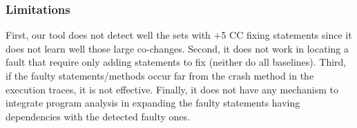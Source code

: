 

\subsubsection{\bf Limitations}
First, our tool does not detect well the sets with +5 CC fixing statements
since it does not learn well those large co-changes. Second, it
does not work in locating a fault that require only adding
statements to fix (neither do all baselines).
Third, if the faulty statements/methods occur far from the crash
method in the execution traces, it is not effective.
Finally, it does not have any mechanism to integrate program analysis
in expanding the faulty statements having dependencies with the
detected faulty ones.



